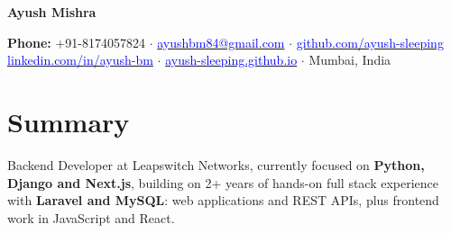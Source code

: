 \documentclass[a4paper,11pt]{article}
\makeatletter
\newcommand{\emaila}{ayushbm84@gmail.com} %
\makeatother
\begin{document}
\selectfont


\begin{center}
    {\LARGE \textbf{Ayush Mishra}}
    
\vspace{1mm}
\textbf{Phone:} +91-8174057824 $\cdot$
\href{mailto:\emaila}{\raisebox{0.0\height}{\footnotesize \faEnvelope} \textcolor{blue}{\emaila}} $\cdot$
\href{https://github.com/ayush-sleeping}{\raisebox{0.0\height}{\footnotesize \faGithub} \textcolor{blue}{github.com/ayush-sleeping}} \\
\href{https://www.linkedin.com/in/ayush-bm/}{\raisebox{0.0\height}{\footnotesize \faLinkedin} \textcolor{blue}{linkedin.com/in/ayush-bm}} $\cdot$
\href{https://ayush-sleeping.github.io/}{\raisebox{0.0\height}{\footnotesize \faGlobe} \textcolor{blue}{ayush-sleeping.github.io}} $\cdot$
{\raisebox{0.0\height}{\footnotesize \faMapMarker*} Mumbai, India}
\end{center}

\section{\textbf{Summary}}
\begin{justify}
\small Backend Developer at Leapswitch Networks, currently focused on \textbf{Python, Django and Next.js}, building on 2+ years of hands-on full stack experience with \textbf{Laravel and MySQL}: web applications and REST APIs, plus frontend work in JavaScript and React.
\end{justify}
\vspace{-2mm}

\end{document}
